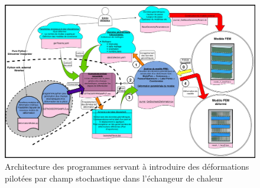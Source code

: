 \documentclass[a4paper,10pt]{article}
\begin{document}
\begin{figure}[H]
   \centering
   \vspace{-2cm}
   \includegraphics[angle=-90,origin=c,width=1.1\textwidth,height=1.1\textheight,keepaspectratio]{SchemaDeformationNastran.jpg}
      \caption{Architecture des programmes servant à introduire des déformations pilotées par champ stochastique dans l'échangeur de chaleur}
         \label{SchemaDeformationNastran}
\end{figure}
\end{document}
